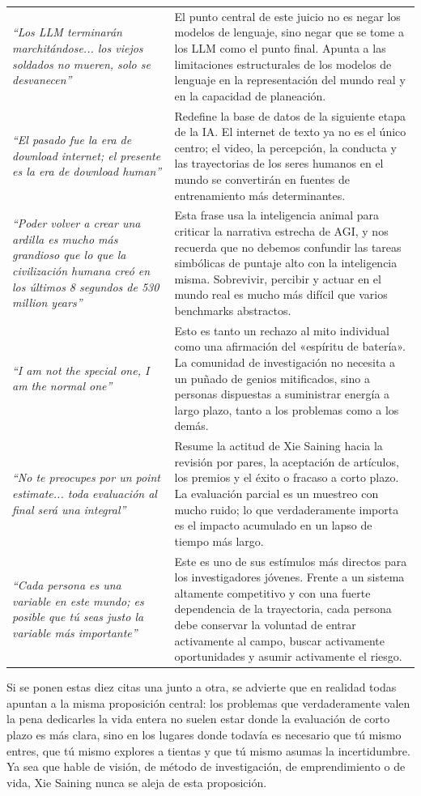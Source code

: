 \begin{longtable}{>{\raggedright\arraybackslash}p{} >{\raggedright\arraybackslash}p{}}
\textit{``Los LLM terminarán marchitándose... los viejos soldados no mueren, solo se desvanecen''} & El punto central de este juicio no es negar los modelos de lenguaje, sino negar que se tome a los LLM como el punto final. Apunta a las limitaciones estructurales de los modelos de lenguaje en la representación del mundo real y en la capacidad de planeación. \\
\textit{``El pasado fue la era de download internet; el presente es la era de download human''} & Redefine la base de datos de la siguiente etapa de la IA. El internet de texto ya no es el único centro; el video, la percepción, la conducta y las trayectorias de los seres humanos en el mundo se convertirán en fuentes de entrenamiento más determinantes. \\
\textit{``Poder volver a crear una ardilla es mucho más grandioso que lo que la civilización humana creó en los últimos 8 segundos de 530 million years''} & Esta frase usa la inteligencia animal para criticar la narrativa estrecha de AGI, y nos recuerda que no debemos confundir las tareas simbólicas de puntaje alto con la inteligencia misma. Sobrevivir, percibir y actuar en el mundo real es mucho más difícil que varios benchmarks abstractos. \\
\textit{``I am not the special one, I am the normal one''} & Esto es tanto un rechazo al mito individual como una afirmación del «espíritu de batería». La comunidad de investigación no necesita a un puñado de genios mitificados, sino a personas dispuestas a suministrar energía a largo plazo, tanto a los problemas como a los demás. \\
\textit{``No te preocupes por un point estimate... toda evaluación al final será una integral''} & Resume la actitud de Xie Saining hacia la revisión por pares, la aceptación de artículos, los premios y el éxito o fracaso a corto plazo. La evaluación parcial es un muestreo con mucho ruido; lo que verdaderamente importa es el impacto acumulado en un lapso de tiempo más largo. \\
\textit{``Cada persona es una variable en este mundo; es posible que tú seas justo la variable más importante''} & Este es uno de sus estímulos más directos para los investigadores jóvenes. Frente a un sistema altamente competitivo y con una fuerte dependencia de la trayectoria, cada persona debe conservar la voluntad de entrar activamente al campo, buscar activamente oportunidades y asumir activamente el riesgo. \\
\bottomrule
\end{longtable}

Si se ponen estas diez citas una junto a otra, se advierte que en realidad todas apuntan a la misma proposición central: los problemas que verdaderamente valen la pena dedicarles la vida entera no suelen estar donde la evaluación de corto plazo es más clara, sino en los lugares donde todavía es necesario que tú mismo entres, que tú mismo explores a tientas y que tú mismo asumas la incertidumbre. Ya sea que hable de visión, de método de investigación, de emprendimiento o de vida, Xie Saining nunca se aleja de esta proposición.



